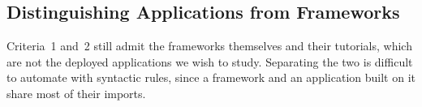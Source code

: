 \subsection{Distinguishing Applications from Frameworks}

Criteria~1 and~2 still admit the frameworks themselves and their tutorials, which are not the deployed applications we wish to study. Separating the two is difficult to automate with syntactic rules, since a framework and an application built on it share most of their imports. 





